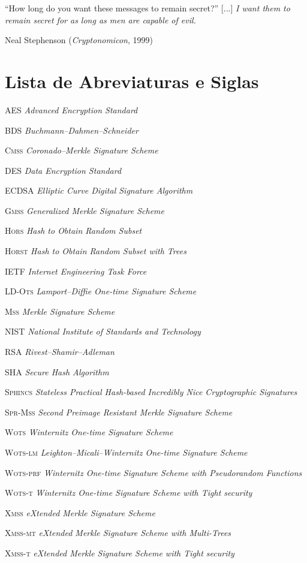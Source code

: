 \documentclass[12pt,notitlepage]{report}
\newcommand{\lots}{\textsc{LD-Ots}}
\newcommand{\wots}{\textsc{Wots}}
\newcommand{\wotsprf}{\textsc{Wots-prf}}
\newcommand{\wotslm}{\textsc{Wots-lm}}
\newcommand{\wotst}{\textsc{Wots-t}}
\newcommand{\hors}{\textsc{Hors}}
\newcommand{\horst}{\textsc{Horst}}
\newcommand{\mss}{\textsc{Mss}}
\newcommand{\cmss}{\textsc{Cmss}}
\newcommand{\gmss}{\textsc{Gmss}}
\newcommand{\sprmss}{\textsc{Spr-Mss}}
\newcommand{\xmss}{\textsc{Xmss}}
\newcommand{\xmsst}{\textsc{Xmss-t}}
\newcommand{\xmssmt}{\textsc{Xmss-mt}}
\newcommand{\sphincs}{\textsc{Sphincs}}
\begin{document}
``How long do you want these messages to remain secret?'' [...]
\emph{I want them to remain secret for as long as men are capable of evil.}

Neal Stephenson (\textit{Cryptonomicon}, 1999)

\listoffigures

\listoftables

\listofalgorithms

\chapter*{Lista de Abreviaturas e Siglas}
\begin{abbrv}
    \item[AES]          \emph{Advanced Encryption Standard}
    \item[BDS]          \emph{Buchmann--Dahmen--Schneider}
    \item[\cmss{}]      \emph{Coronado--Merkle Signature Scheme}
    \item[DES]          \emph{Data Encryption Standard}
    \item[ECDSA]        \emph{Elliptic Curve Digital Signature Algorithm}
    \item[\gmss{}]      \emph{Generalized Merkle Signature Scheme}
    \item[\hors{}]      \emph{Hash to Obtain Random Subset}
    \item[\horst{}]     \emph{Hash to Obtain Random Subset with Trees}
    \item[IETF]         \emph{Internet Engineering Task Force}
    \item[\lots{}]      \emph{Lamport--Diffie One-time Signature Scheme}
    \item[\mss{}]       \emph{Merkle Signature Scheme}
    \item[NIST]         \emph{National Institute of Standards and Technology}
    \item[RSA]          \emph{Rivest--Shamir--Adleman}
    \item[SHA]          \emph{Secure Hash Algorithm}
    \item[\sphincs{}]   \emph{Stateless Practical Hash-based Incredibly Nice Cryptographic Signatures}
    \item[\sprmss{}]    \emph{Second Preimage Resistant Merkle Signature Scheme}
    \item[\wots{}]      \emph{Winternitz One-time Signature Scheme}
    \item[\wotslm{}]    \emph{Leighton--Micali--Winternitz One-time Signature Scheme}
    \item[\wotsprf{}]   \emph{Winternitz One-time Signature Scheme with Pseudorandom Functions}
    \item[\wotst{}]     \emph{Winternitz One-time Signature Scheme with Tight security}
    \item[\xmss{}]      \emph{eXtended Merkle Signature Scheme}
    \item[\xmssmt{}]    \emph{eXtended Merkle Signature Scheme with Multi-Trees}
    \item[\xmsst{}]     \emph{eXtended Merkle Signature Scheme with Tight security}
\end{abbrv}
\end{document}
